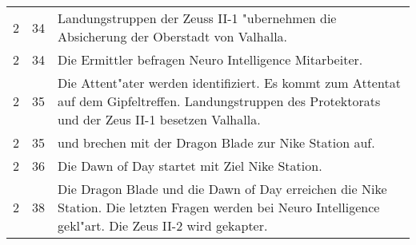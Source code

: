 \begin{boxedtext}
\begin{tabularx}{\textwidth}{r r X}
        2       &   34 & Landungstruppen der Zeuss II-1 "ubernehmen die Absicherung der Oberstadt von Valhalla.\\
        2       &   34 & Die Ermittler befragen Neuro Intelligence Mitarbeiter.\\
        2       &   35 & Die Attent"ater werden identifiziert. Es kommt zum Attentat auf dem Gipfeltreffen. Landungstruppen des 
                         Protektorats  und der Zeus II-1 besetzen Valhalla. \\
        2       &   35 & \xl{} und \ml{} brechen mit der Dragon Blade zur Nike Station auf.\\
        2       &   36 & Die Dawn of Day startet mit Ziel Nike Station.\\
        2       &   38 & Die Dragon Blade und die Dawn of Day erreichen die Nike Station. Die letzten Fragen werden bei Neuro Intelligence 
                         gekl"art. Die Zeus II-2 wird gekapter.\\
    \end{tabularx}
\end{boxedtext}
\renewcommand{\arraystretch}{1}
\pagebreak
